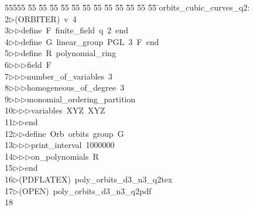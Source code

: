 %
%
\begin{tabbing}
55555 \= 55 \= 55 \= 55 \= 55 \= 55 \= 55 \= 55 \= 55 \= 55 \= 55 \= 55 \= 55 \= \>orbits\_cubic\_curves\_q2:\\[0pt]
2\>$\triangleright$\>(ORBITER)\ v\ 4\ \\[0pt]
3\>$\triangleright$\>$\triangleright$\>define\ F\ finite\_field\ q\ 2\ end\ \\[0pt]
4\>$\triangleright$\>$\triangleright$\>define\ G\ linear\_group\ PGL\ 3\ F\ end\ \\[0pt]
5\>$\triangleright$\>$\triangleright$\>define\ R\ polynomial\_ring\ \\[0pt]
6\>$\triangleright$\>$\triangleright$\>$\triangleright$\>field\ F\ \\[0pt]
7\>$\triangleright$\>$\triangleright$\>$\triangleright$\>number\_of\_variables\ 3\ \\[0pt]
8\>$\triangleright$\>$\triangleright$\>$\triangleright$\>homogeneous\_of\_degree\ 3\ \\[0pt]
9\>$\triangleright$\>$\triangleright$\>$\triangleright$\>monomial\_ordering\_partition\ \\[0pt]
10\>$\triangleright$\>$\triangleright$\>$\triangleright$\>variables\ XYZ\ XYZ\ \\[0pt]
11\>$\triangleright$\>$\triangleright$\>end\ \\[0pt]
12\>$\triangleright$\>$\triangleright$\>define\ Orb\ orbits\ group\ G\ \\[0pt]
13\>$\triangleright$\>$\triangleright$\>$\triangleright$\>print\_interval\ 1000000\ \\[0pt]
14\>$\triangleright$\>$\triangleright$\>$\triangleright$\>on\_polynomials\ R\ \\[0pt]
15\>$\triangleright$\>$\triangleright$\>end\\[0pt]
16\>$\triangleright$\>(PDFLATEX)\ poly\_orbits\_d3\_n3\_q2tex\\[0pt]
17\>$\triangleright$\>(OPEN)\ poly\_orbits\_d3\_n3\_q2pdf\\[0pt]
18\>\end{tabbing}
